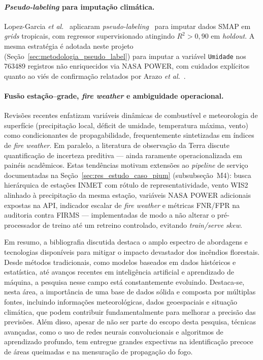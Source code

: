 \paragraph{\emph{Pseudo-labeling} para imputação climática.} Lopez-Garcia \emph{et al.}~\cite{lopezgarcia2024spatiotemporal} aplicaram \emph{pseudo-labeling}~\cite{lee2013pseudo} para imputar dados SMAP em \emph{grids} tropicais, com regressor supervisionado atingindo \(R^2 > 0{,}90\) em \emph{holdout}. A mesma estratégia é adotada neste projeto (Seção~\ref{sec:metodologia_pseudo_label}) para imputar a variável \texttt{Umidade} nos \num{763489} registros não enriquecidos via NASA POWER, com cuidados explícitos quanto ao viés de confirmação relatados por Arazo \emph{et al.}~\cite{arazo2020pseudo}.

\paragraph{Fusão estação--grade, \emph{fire weather} e ambiguidade operacional.} Revisões recentes enfatizam variáveis dinâmicas de combustível e meteorologia de superfície (precipitação local, déficit de umidade, temperatura máxima, vento) como condicionantes de propagabilidade, frequentemente sintetizadas em índices de \emph{fire weather}. Em paralelo, a literatura de observação da Terra discute quantificação de incerteza preditiva --- ainda raramente operacionalizada em painéis acadêmicos. Estas tendências motivam extensões ao \emph{pipeline} de serviço documentadas na Seção~\ref{sec:res_estudo_caso_pium} (subsubseção~M4): busca hierárquica de estações INMET com rótulo de representatividade, vento WIS2 alinhado à precipitação da mesma estação, variáveis NASA POWER adicionais expostas na API, indicador escalar de \emph{fire weather} e métricas FNR/FPR na auditoria contra FIRMS --- implementadas de modo a não alterar o pré-processador de treino até um retreino controlado, evitando \emph{train/serve skew}.

Em resumo, a bibliografia discutida destaca o amplo espectro de abordagens e tecnologias disponíveis para mitigar o impacto devastador dos incêndios florestais. Desde métodos tradicionais, como modelos baseados em dados históricos e estatística, até avanços recentes em inteligência artificial e aprendizado de máquina, a pesquisa nesse campo está constantemente evoluindo. Destaca-se, nesta área, a importância de uma base de dados sólida e composta por múltiplas fontes, incluindo informações meteorológicas, dados geoespaciais e situação climática, que podem contribuir fundamentalmente para melhorar a precisão das previsões. Além disso, apesar de não ser parte do escopo desta pesquisa, técnicas avançadas, como o uso de redes neurais convolucionais e algoritmos de aprendizado profundo, tem entregue grandes expectivas na identificação precoce de áreas queimadas e na mensuração de propagação do fogo.

